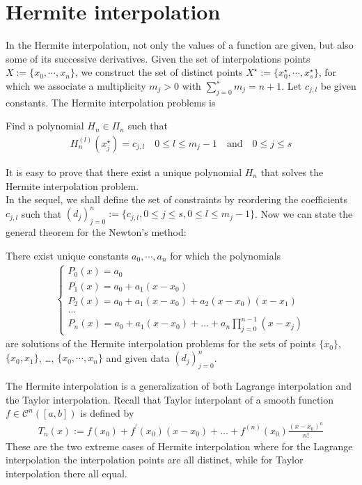 \section{Hermite interpolation}
In the Hermite interpolation, not only the values of a function are given, but also some of its successive derivatives. Given the set of interpolations points $X:=\{ x_0, \cdots,x_n\}$, we construct the set of distinct points $X^\star:=\{ x_0^\star, \cdots,x_s^\star\}$, for which we associate a multiplicity $m_j > 0$ with $\sum_{j=0}^s m_j = n+1$. Let $c_{j,l}$ be given constants. The Hermite interpolation problems is
\begin{definition}
  Find a polynomial $H_n \in \Pi_n$ such that
  \begin{align}
    H_n^{(l)}(x_j^\star) = c_{j,l} \quad 0 \leq l \leq m_j -1 \quad \mbox{and} \quad 0 \leq j \leq s
  \end{align}
\end{definition}
It is easy to prove that there exist a unique polynomial $H_n$ that solves the Hermite interpolation problem.
\\
\noindent
In the sequel, we shall define the set of constraints by reordering the coefficients $c_{j,l}$ such that $\left( d_j \right)_{j=0}^{n} := \{ c_{j,l}, 0 \leq j \leq s,  0 \leq l \leq m_j -1 \}$. Now we can state the general theorem for the Newton's method:
\begin{theorem}
  There exist unique constants $a_0, \cdots, a_n$ for which the polynomials
  \begin{align}
    \begin{cases}
      P_0(x) = a_0
      \\
      P_1(x) = a_0 + a_1(x-x_0)
      \\
      P_2(x) = a_0 + a_1(x-x_0) + a_2(x-x_0)(x-x_1)
      \\
      \ldots
      \\
      P_n(x) = a_0 + a_1(x-x_0) + \ldots + a_n\prod\limits_{j=0}^{n-1}\left( x - x_j \right) 
    \end{cases}
  \end{align}
  are solutions of the Hermite interpolation problems for the sets of points $\{x_0\}$,  $\{x_0, x_1\}$, \ldots, $\{x_0, \cdots, x_n\}$ and given data $\left( d_j \right)_{j=0}^{n}$. 
\end{theorem}
\begin{remark}
  The Hermite interpolation is a generalization of both Lagrange interpolation and the Taylor interpolation. Recall that Taylor interpolant of a smooth function $f \in \mathcal{C}^n([a,b])$ is defined by
  \begin{align}
    T_n(x) := f(x_0) + f^\prime(x_0)(x-x_0) + \ldots + f^{(n)}(x_0)\frac{(x-x_0)^n}{n!} 
  \end{align}
  These are the two extreme cases of Hermite interpolation where for the Lagrange interpolation the interpolation points are all distinct, while for Taylor interpolation there all equal.
\end{remark}

